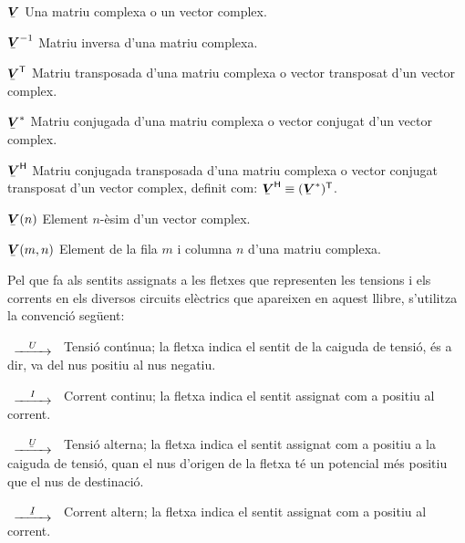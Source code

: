 \begin{list}{}
    \item[$\mcmplx{V}$] Una matriu complexa o un vector complex.
    \item[$\mcmplx{V}^{-1}$] Matriu inversa d'una matriu complexa.
    \item[$\transp{\mcmplx{V}}$] Matriu transposada d'una matriu complexa o vector
    transposat d'un vector complex.
    \item[$\mcmplx{V}^*$] Matriu conjugada d'una matriu complexa o vector
    conjugat d'un vector complex.
    \item[$\hermit{V}$] Matriu conjugada transposada d'una matriu complexa o vector
    conjugat transposat d'un vector complex, definit com: $\hermit{V} \equiv
    \transp{(\mcmplx{V}^*)}$.
    \item[$\mcmplx{V}(n)$] Element $n$-\`{e}sim d'un vector complex.
    \item[$\mcmplx{V}(m,n)$] Element de la fila $m$ i columna $n$ d'una matriu complexa.
\end{list}

Pel que fa als sentits assignats a les fletxes que representen les
tensions i els corrents en els diversos circuits el\`{e}ctrics que
apareixen en aquest llibre, s'utilitza la convenci\'{o} seg\"{u}ent:

\begin{list}{}
{\setlength{\labelwidth}{15mm} \setlength{\leftmargin}{20mm}
\setlength{\labelsep}{5mm}}
    \item[$\begin{CD} @>U>> \end{CD}$] Tensi\'{o} cont\'{\i}nua; la fletxa indica el sentit
    de la caiguda de tensi\'{o}, \'{e}s a dir, va del nus positiu al nus negatiu.
    \item[$\begin{CD} @>I>> \end{CD}$] Corrent
    continu; la fletxa indica el sentit  assignat com a positiu al corrent.
    \item[$\begin{CD} @>\cmplx{U}>> \end{CD}$] Tensi\'{o} alterna; la fletxa indica el
    sentit assignat com a positiu a la caiguda de tensi\'{o}, quan el nus d'origen de la fletxa
    t\'{e} un potencial  m\'{e}s positiu que el nus de destinaci\'{o}.
    \item[$\begin{CD} @>\cmplx{I}>> \end{CD}$] Corrent altern; la fletxa
    indica el sentit  assignat com a positiu al corrent.
\end{list}

